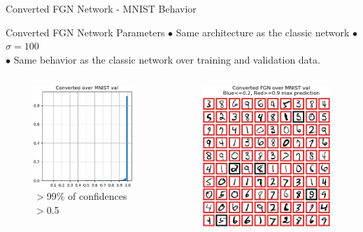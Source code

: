 \documentclass{beamer}
\begin{document}
\begin{frame}{Converted FGN Network - MNIST Behavior}
    
    \begin{block}{Converted FGN Network Parameters}
    $\bullet$ Same architecture as the classic network $\bullet$ $\sigma = 100$\\
    $\bullet$ Same behavior as the classic network over training and validation data.
    \end{block}

    \begin{columns}
    \begin{column}{.5\textwidth}
    \begin{figure}
        \centering
        \includegraphics[width=.82\textwidth]{images/mnist-behavior/converted-hist-val.png}
        \caption*{ $>$99\% of confidences $>$0.5}
    \end{figure}
    \end{column}
    \begin{column}{.5\textwidth}
    \begin{figure}
        \raggedright
        \vspace{-3mm}
        \includegraphics[width=.73\textwidth]{images/mnist-behavior/converted-pred-val.png}

\end{figure}
\end{column}
\end{columns}
\end{frame}
\end{document}
